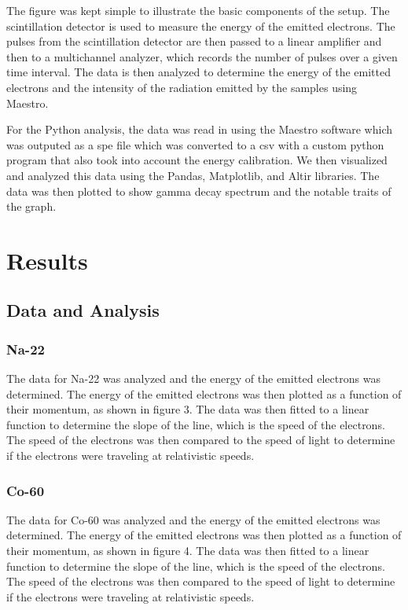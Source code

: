 \documentclass[12pt]{article}
\begin{document}
                        
                        The figure was kept simple to illustrate the basic components of the setup. 
                        The scintillation detector is used to measure the energy of the emitted electrons. 
                        The pulses from the scintillation detector are then passed to a linear amplifier and then 
                        to a multichannel analyzer, which records the number of pulses over a given time interval. 
                        The data is then analyzed to determine the energy of the emitted electrons and the intensity 
                        of the radiation emitted by the samples using Maestro.


                        For the Python analysis, the data was read in using the Maestro software which was outputed as a 
                        spe file which was converted to a csv with a custom python program that also took into account 
                        the energy calibration. We then visualized and analyzed this data using the Pandas, Matplotlib, and Altir libraries. 
                        The data was then plotted to show gamma decay spectrum and the notable traits of the graph.



\section{Results}
        \subsection{Data and Analysis}

                \subsubsection{Na-22}
                The data for Na-22 was analyzed and the energy of the emitted electrons was determined. 
                The energy of the emitted electrons was then plotted as a function of their momentum, 
                as shown in figure 3. The data was then fitted to a linear function to determine the slope 
                of the line, which is the speed of the electrons. The speed of the electrons was then compared 
                to the speed of light to determine if the electrons were traveling at relativistic speeds.

                \subsubsection{Co-60}
                The data for Co-60 was analyzed and the energy of the emitted electrons was determined. 
                The energy of the emitted electrons was then plotted as a function of their momentum, 
                as shown in figure 4. The data was then fitted to a linear function to determine the slope 
                of the line, which is the speed of the electrons. The speed of the electrons was then compared 
                to the speed of light to determine if the electrons were traveling at relativistic speeds.
\end{document}
